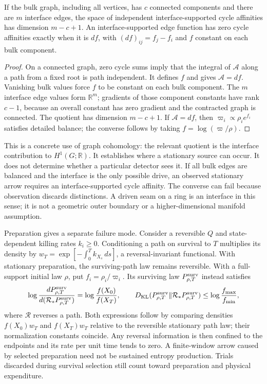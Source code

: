 \begin{proposition}
\label{prop:continuous-source}
If the bulk graph, including all vertices, has $c$ connected components and
there are $m$ interface edges, the space of independent interface-supported
cycle affinities has dimension $m-c+1$. An interface-supported edge function
has zero cycle affinities exactly when it is $df$, with
$(df)_{ij}=f_j-f_i$ and $f$ constant on each bulk component.
\end{proposition}
\begin{proof}
On a connected graph, zero cycle sums imply that the integral of $\mathcal A$
along a path from a fixed root is path independent. It defines $f$ and gives
$\mathcal A=df$. Vanishing bulk values force $f$ to be constant on each bulk
component. The $m$ interface edge values form $\mathbb R^m$; gradients of those
component constants have rank $c-1$, because an overall constant has zero
gradient and the contracted graph is connected. The quotient has dimension
$m-c+1$. If $\mathcal A=df$, then $\varpi_i\propto\rho_i e^{f_i}$ satisfies
detailed balance; the converse follows by taking $f=\log(\varpi/\rho)$.
\end{proof}

This is a concrete use of graph cohomology: the relevant quotient is the
interface contribution to $H^1(G;\mathbb R)$. It establishes where a stationary
source can occur. It does not determine whether a particular detector sees
it. If all bulk edges are balanced and the interface is the only possible
drive, an observed stationary arrow requires an interface-supported cycle
affinity. The converse can fail because observation discards distinctions.
A driven seam on a ring is an interface in this sense; it is not a geometric
outer boundary or a higher-dimensional manifold assumption.

Preparation gives a separate failure mode. Consider a reversible $Q$ and
state-dependent killing rates $k_i\geq0$. Conditioning a path on survival to
$T$ multiplies its density by
$w_T=\exp[-\int_0^T k_{X_s}\,ds]$, a reversal-invariant functional. With
stationary preparation, the surviving-path law remains reversible. With a
full-support initial law $\rho$, put $f_i=\rho_i/\varpi_i$. Its surviving law
$P^{\rm surv}_{\rho,T}$ instead satisfies
\begin{equation}
 \log\frac{dP^{\rm surv}_{\rho,T}}
               {d(\mathcal R_*P^{\rm surv}_{\rho,T})}
   =\log\frac{f(X_0)}{f(X_T)},\qquad
 D_{\rm KL}(P^{\rm surv}_{\rho,T}\Vert
             \mathcal R_*P^{\rm surv}_{\rho,T})
 \leq\log\frac{f_{\max}}{f_{\min}},
 \label{eq:continuous-survival}
\end{equation}
where $\mathcal R$ reverses a path. Both expressions follow by comparing
densities $f(X_0)w_T$ and $f(X_T)w_T$ relative to the reversible stationary
path law; their normalization constants coincide. Any reversal information
is then confined to the endpoints and its rate per unit time tends to zero.
A finite-window arrow caused by selected preparation need not be sustained
entropy production. Trials discarded during survival selection still count
toward preparation and physical expenditure.

